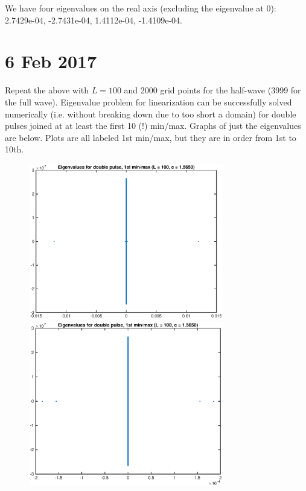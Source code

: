 \documentclass[12pt]{article}
\begin{document}
We have four eigenvalues on the real axis (excluding the eigenvalue at 0): 2.7429e-04, -2.7431e-04, 1.4112e-04, -1.4109e-04.

\section*{6 Feb 2017}
Repeat the above with $L = 100$ and 2000 grid points for the half-wave (3999 for the full wave). Eigenvalue problem for linearization can be successfully solved numerically (i.e. without breaking down due to too short a domain) for double pulses joined at at least the first 10 (!) min/max. Graphs of just the eigenvalues are below. Plots are all labeled 1st min/max, but they are in order from 1st to 10th.

	\begin{figure}[H]
	\includegraphics[width=8.5cm]{L100eigs1.eps}
	\includegraphics[width=8.5cm]{L100eigs2.eps}
	\end{figure}
\end{document}
